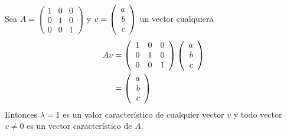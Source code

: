 \begin{ejemplo}
Sea $A = \left( \begin{array}{rrr}
1 & 0 & 0\\
0 & 1 & 0\\
0 & 0 & 1
\end{array} \right)$ y $v = \left( \begin{array}{r} a\\ b\\ c \end{array} \right) $ un vector cualquiera
\begin{align*}
Av &= \left( \begin{array}{rrr}
1 & 0 & 0\\
0 & 1 & 0\\
0 & 0 & 1
\end{array} \right) \left( \begin{array}{r} a\\ b\\ c \end{array} \right) \\
&= \left( \begin{array}{r} a\\ b\\ c \end{array} \right) 
\end{align*}
Entonces $\lambda = 1$ es un valor característico de cualquier vector $v$ y todo vector $v \neq 0$ es un vector característico de $A$.
\end{ejemplo}


